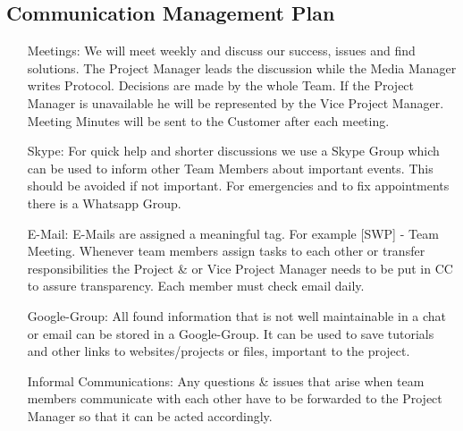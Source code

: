 \documentclass[11pt,a4paper]{article}
\begin{document}
\subsection{Communication Management Plan}
\begin{itemize}
\item[Meetings:] We will meet weekly and discuss our success, issues and find solutions. The Project Manager leads the discussion while the Media Manager writes Protocol. Decisions are made by the whole Team. If the Project Manager is unavailable he will be represented by the Vice Project Manager. Meeting Minutes will be sent to the Customer after each meeting.
\item[Skype:] For quick help and shorter discussions we use a Skype Group which can be used to inform other Team Members about important events. This should be avoided if not important. For emergencies and to fix appointments there is a Whatsapp Group. 
\item[E-Mail:] E-Mails are assigned a meaningful tag. For example [SWP] - Team Meeting. Whenever team members assign tasks to each other or transfer responsibilities the Project \& or Vice Project Manager needs to be put in CC to assure transparency. Each member must check email daily.
\item[Google-Group:] All found information that is not well maintainable in a chat or email can be stored in a Google-Group. It can be used to save tutorials and other links to websites\slash projects or files, important to the project.
\item[Informal Communications:] Any questions \& issues that arise when team members communicate with each other have to be forwarded to the Project Manager so that it can be acted accordingly.  
\end{itemize}
\end{document}
